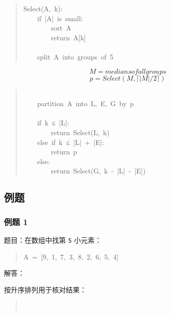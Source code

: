 \documentclass[UTF8,zihao=-4]{ctexart}
\begin{document}
\begin{quote}
\small\ttfamily\raggedright
\relax Select(A,\ k):\\
\relax \ \ \ \ if\ |A|\ is\ small:\\
\relax \ \ \ \ \ \ \ \ sort\ A\\
\relax \ \ \ \ \ \ \ \ return\ A[k]\\
\mbox{}\\
\relax \ \ \ \ split\ A\ into\ groups\ of\ 5\\
\end{quote}
\[M = medians of all groups\]
\[p = Select(M, \lceil |M| / 2 \rceil)\]
\begin{quote}
\small\ttfamily\raggedright
\mbox{}\\
\relax \ \ \ \ partition\ A\ into\ L,\ E,\ G\ by\ p\\
\mbox{}\\
\relax \ \ \ \ if\ k\ ≤\ |L|:\\
\relax \ \ \ \ \ \ \ \ return\ Select(L,\ k)\\
\relax \ \ \ \ else\ if\ k\ ≤\ |L|\ +\ |E|:\\
\relax \ \ \ \ \ \ \ \ return\ p\\
\relax \ \ \ \ else:\\
\relax \ \ \ \ \ \ \ \ return\ Select(G,\ k\ -\ |L|\ -\ |E|)\\
\end{quote}

\subsection*{例题}

\subsubsection*{例题 1}

题目：在数组中找第 \texttt{5} 小元素：

\begin{quote}
\small\ttfamily\raggedright
\relax A\ =\ [9,\ 1,\ 7,\ 3,\ 8,\ 2,\ 6,\ 5,\ 4]\\
\end{quote}

解答：

按升序排列用于核对结果：

\begin{quote}
\small\ttfamily\raggedright
\relax [1,\ 2,\ 3,\ 4,\ 5,\ 6,\ 7,\ 8,\ 9]\\
\end{quote}
\end{document}
